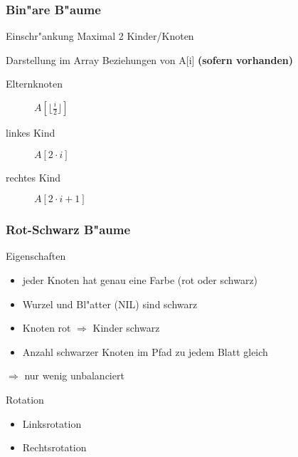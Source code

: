 \documentclass{beamer}
\begin{document}
\begin{frame}
\frametitle{Bin"are B"aume}
\begin{alertblock}{Einschr"ankung}
Maximal 2 Kinder/Knoten
\end{alertblock}

\pause

\begin{block}{Darstellung im Array}
Beziehungen von A[i] \textbf{(sofern vorhanden)}
\pause
\begin{description}
\item[Elternknoten] $A[\lfloor\frac{i}{2}\rfloor]$
\item[linkes Kind] $A[2 \cdot i]$
\item[rechtes Kind] $A[2 \cdot i + 1]$
\end{description}
\end{block}


\end{frame}


\begin{frame}
\frametitle{Rot-Schwarz B"aume}
\begin{alertblock}{Eigenschaften}
\begin{itemize}
\item jeder Knoten hat genau eine Farbe (rot oder schwarz)
\item Wurzel und Bl"atter (NIL) sind schwarz
\item Knoten rot $\Rightarrow$ Kinder schwarz
\item Anzahl schwarzer Knoten im Pfad zu jedem Blatt gleich
\end{itemize}
$\Longrightarrow$ nur wenig unbalanciert
\end{alertblock}

\begin{block}{Rotation}
\begin{itemize}
\item Linksrotation
\item Rechtsrotation
\end{itemize}
\end{block}

\end{frame}
\end{document}
